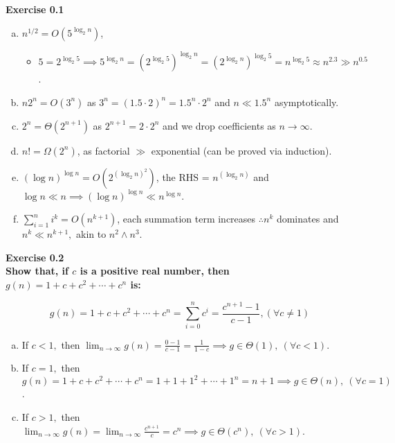 \documentclass{article}
\newenvironment{problem}[2][Exercise]
    { \begin{mdframed}[backgroundcolor=gray!20] \textbf{#1 #2} \\}
    {  \end{mdframed}}
\begin{document}
\begin{problem}{0.1}
\begin{enumerate}[(a)]
        \item $n^{1/2}=O(5^{\log_2 n})$, 
            \begin{itemize}
                \item $5=2^{\log_2 5}\implies5^{\log_2 n}
                    =(2^{\log_2 5})^{\log_2 n}
                    =(2^{\log_2 n})^{\log_2 5}
                    =n^{\log_2 5}\approx n^{2.3}\gg n^{0.5}$.
            \end{itemize}
        \item $n2^n=O(3^n)$ as $3^n = (1.5 \cdot 2)^n = 1.5^n \cdot 2^n$ and $n\ll 1.5^n$ asymptotically.
        \item $2^n=\Theta(2^{n+1})$ as $2^{n+1}=2\cdot2^{n}$ and we drop coefficients as $n\to\infty$.
        \item $n!=\Omega(2^n)$, as factorial $\gg$ exponential (can be proved via induction).
        \item $(\log n)^{\log n}=O(2^{{(\log_2 n)}^2})$, the RHS = $n^{(\log_2 n)}$ and $\log n\ll n
        \implies
        (\log n)^{\log n}\ll n^{\log n}$.
        \item $\displaystyle\sum_{i=1}^n i^k = O(n^{k+1})$, each summation term increases $\therefore n^k$ dominates and $n^k\ll n^{k+1},$ akin to $n^2\land n^3$.
    \end{enumerate}
\end{problem}

\newpage
\begin{problem}{0.2}
    \textbf{Show that, if $c$ is a positive real number, then $g(n) = 1 + c + c^2 + \cdots + c^n$ is:}

    \[
        g(n) 
        = 1 + c + c^2 + \cdots + c^n 
        = \displaystyle\sum_{i=0}^n c^i
        = \frac{c^{n+1}-1}{c-1}, 
        (\forall c\neq 1)
    \]

    \begin{enumerate}[(a)]
        \item If $c<1,$ 
        then $\displaystyle\lim_{n\to\infty}g(n)
        =\frac{0-1}{c-1}
        =\frac{1}{1-c}
        \implies \boxed{g\in\Theta(1),} \  (\forall c < 1)$.
        \item If $c=1,$ 
        then $g(n) 
        = 1 + c + c^2 + \cdots + c^n
        = 1 + 1 + 1^2 + \cdots + 1^n
        = n + 1
        \implies \boxed{g\in\Theta(n),} \  (\forall c=1)$.
        \item If $c>1,$ 
        then $\displaystyle\lim_{n\to\infty}g(n)
        =\lim_{n\to\infty}\frac{c^{n+1}}{c}
        = c^n
        \implies \boxed{g\in\Theta(c^n),} \  (\forall c > 1)$.
    \end{enumerate}
\end{problem}
\end{document}
